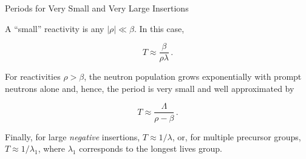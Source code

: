 \documentclass[aspectratio=1610]{beamer}
\begin{document}
\begin{frame}[fragile]{Periods for Very Small and Very Large Insertions}

A ``small'' reactivity is any $|\rho| \ll \beta$.  In this case,                        

\begin{equation*}
\tag{FNRP 5.57}
 T \approx \frac{\beta}{\rho \lambda}\, .
\end{equation*}

For reactivities $\rho > \beta$, the neutron population grows exponentially with prompt neutrons alone and, hence, the period is very small and well approximated by

\begin{equation*}
\tag{FNRP 5.58}
 T \approx \frac{\Lambda}{\rho - \beta} \, .
\end{equation*}

Finally, for large {\it negative} insertions, $T \approx 1/\lambda$, or, for multiple precursor groups, $T \approx 1/\lambda_1$, where $\lambda_1$ corresponds to the longest lives group.

\end{frame}
\end{document}
